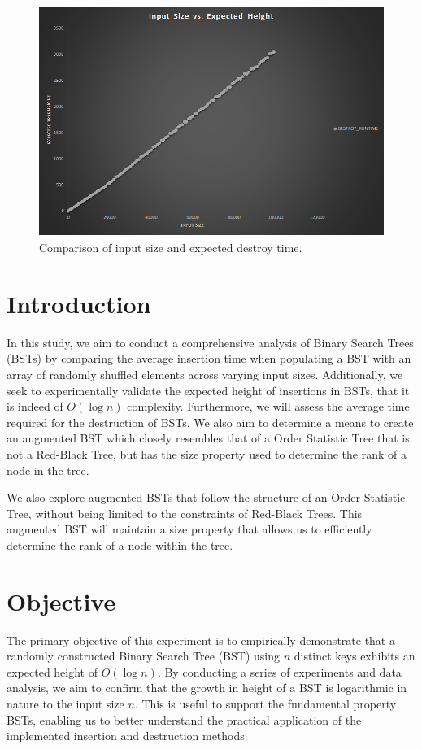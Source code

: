 \documentclass[a4paper,twoside,12pt]{report}
\begin{document}
\begin{figure}[h]
	\centering
	\includegraphics[width=1.0\textwidth]{images/size-vs-destroy-time}
	\caption{Comparison of input size and expected destroy time.}
	\label{fig:size-vs-destroy-time}
\end{figure}

\newpage
{}

\newpage
{}

\chapter{Introduction}
In this study, we aim to conduct a comprehensive analysis of Binary Search Trees (BSTs) by comparing the average insertion time when populating a BST with an array of randomly shuffled elements across varying input sizes. Additionally, we seek to experimentally validate the expected height of insertions in BSTs, that it is indeed of $O(\log n)$ complexity. Furthermore, we will assess the average time required for the destruction of BSTs.
We also aim to determine a means to create an augmented BST which closely resembles that of a Order Statistic Tree that is not a Red-Black Tree, but has the size property used to determine the rank of a node in the tree.

We also explore augmented BSTs that follow the structure of an Order Statistic Tree, without being limited to the constraints of Red-Black Trees. This augmented BST will maintain a size property that allows us to efficiently determine the rank of a node within the tree.



\chapter{Objective}
The primary objective of this experiment is to empirically demonstrate that a randomly constructed Binary Search Tree (BST) using $n$ distinct keys exhibits an expected height of $O(\log n)$. By conducting a series of experiments and data analysis, we aim to confirm that the growth in height of a BST is logarithmic in nature to the input size $n$. This is useful to support the fundamental property BSTs, enabling us to better understand the practical application of the implemented insertion and destruction methods.
\end{document}
